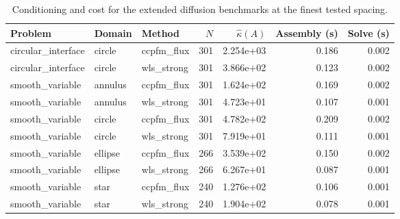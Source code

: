 \begin{table}[t]
\centering
\caption{Conditioning and cost for the extended diffusion benchmarks at the finest tested spacing.}
\label{tab:extended_cost}
\begin{tabular}{lllrrrr}
\toprule
Problem & Domain & Method & $N$ & $\widehat\kappa(A)$ & Assembly (s) & Solve (s) \\
\midrule
circular\_interface & circle & ccpfm\_flux & 301 & 2.254e+03 & 0.186 & 0.002 \\
circular\_interface & circle & wls\_strong & 301 & 3.866e+02 & 0.123 & 0.002 \\
smooth\_variable & annulus & ccpfm\_flux & 301 & 1.624e+02 & 0.169 & 0.002 \\
smooth\_variable & annulus & wls\_strong & 301 & 4.723e+01 & 0.107 & 0.001 \\
smooth\_variable & circle & ccpfm\_flux & 301 & 4.782e+02 & 0.209 & 0.002 \\
smooth\_variable & circle & wls\_strong & 301 & 7.919e+01 & 0.111 & 0.001 \\
smooth\_variable & ellipse & ccpfm\_flux & 266 & 3.539e+02 & 0.150 & 0.002 \\
smooth\_variable & ellipse & wls\_strong & 266 & 6.267e+01 & 0.087 & 0.001 \\
smooth\_variable & star & ccpfm\_flux & 240 & 1.276e+02 & 0.106 & 0.001 \\
smooth\_variable & star & wls\_strong & 240 & 1.904e+02 & 0.078 & 0.001 \\
\bottomrule
\end{tabular}
\end{table}

